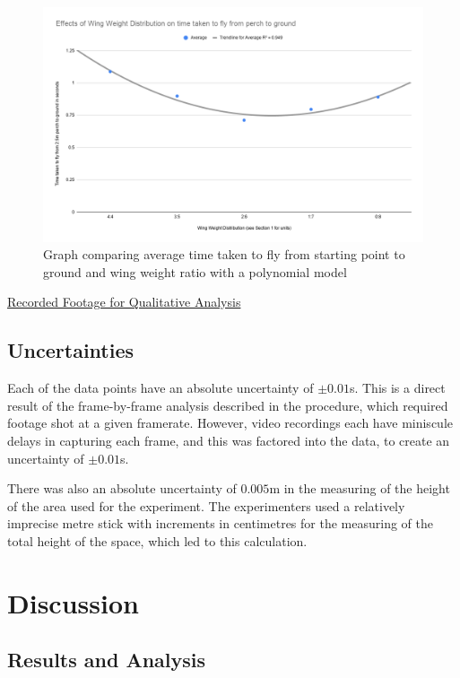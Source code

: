 \documentclass[]{article}
\theoremstyle{definition}
\begin{document}
\begin{figure}[H]
    \centering
    \includegraphics[scale=0.35]{graphics/graph-quadratic.png}
    \caption{Graph comparing average time taken to fly from starting point to ground and wing weight ratio with a polynomial model}
    \label{Quadratic Chart}
\end{figure}

\href{https://drive.google.com/open?id=1pxjHiAVFEnyUj759QoK4n0mFYVah-jPS}{Recorded Footage for Qualitative Analysis} \label{Qualitative Data Footage}

\subsection{Uncertainties}
Each of the data points have an absolute uncertainty of $\pm 0.01$s. This is a direct result of the frame-by-frame analysis described in the procedure, which required footage shot at a given framerate. However, video recordings each have miniscule delays in capturing each frame, and this was factored into the data, to create an uncertainty of $\pm 0.01$s.

There was also an absolute uncertainty of $0.005$m in the measuring of the height of the area used for the experiment. The experimenters used a relatively imprecise metre stick with increments in centimetres for the measuring of the total height of the space, which led to this calculation. 

\section{Discussion}

\subsection{Results and Analysis}
\end{document}
